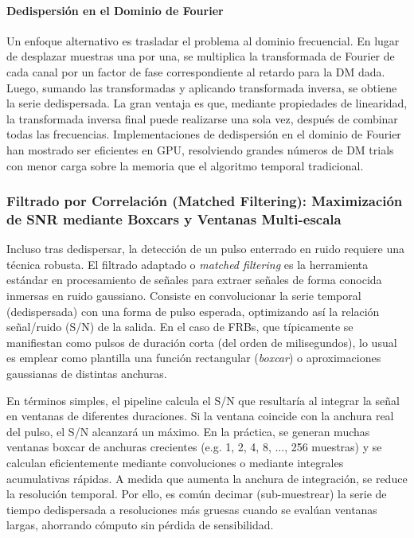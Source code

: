 \paragraph{Dedispersión en el Dominio de Fourier}

Un enfoque alternativo es trasladar el problema al dominio frecuencial. En lugar de desplazar muestras una por una, se multiplica la transformada de Fourier de cada canal por un factor de fase correspondiente al retardo para la DM dada. Luego, sumando las transformadas y aplicando transformada inversa, se obtiene la serie dedispersada. La gran ventaja es que, mediante propiedades de linearidad, la transformada inversa final puede realizarse una sola vez, después de combinar todas las frecuencias. Implementaciones de dedispersión en el dominio de Fourier han mostrado ser eficientes en GPU, resolviendo grandes números de DM trials con menor carga sobre la memoria que el algoritmo temporal tradicional.

\subsubsection{Filtrado por Correlación (Matched Filtering): Maximización de SNR mediante Boxcars y Ventanas Multi-escala}

Incluso tras dedispersar, la detección de un pulso enterrado en ruido requiere una técnica robusta. El filtrado adaptado o \textit{matched filtering} es la herramienta estándar en procesamiento de señales para extraer señales de forma conocida inmersas en ruido gaussiano. Consiste en convolucionar la serie temporal (dedispersada) con una forma de pulso esperada, optimizando así la relación señal/ruido (S/N) de la salida. En el caso de FRBs, que típicamente se manifiestan como pulsos de duración corta (del orden de milisegundos), lo usual es emplear como plantilla una función rectangular (\textit{boxcar}) o aproximaciones gaussianas de distintas anchuras.

En términos simples, el pipeline calcula el S/N que resultaría al integrar la señal en ventanas de diferentes duraciones. Si la ventana coincide con la anchura real del pulso, el S/N alcanzará un máximo. En la práctica, se generan muchas ventanas boxcar de anchuras crecientes (e.g. 1, 2, 4, 8, ..., 256 muestras) y se calculan eficientemente mediante convoluciones o mediante integrales acumulativas rápidas. A medida que aumenta la anchura de integración, se reduce la resolución temporal. Por ello, es común decimar (sub-muestrear) la serie de tiempo dedispersada a resoluciones más gruesas cuando se evalúan ventanas largas, ahorrando cómputo sin pérdida de sensibilidad.

